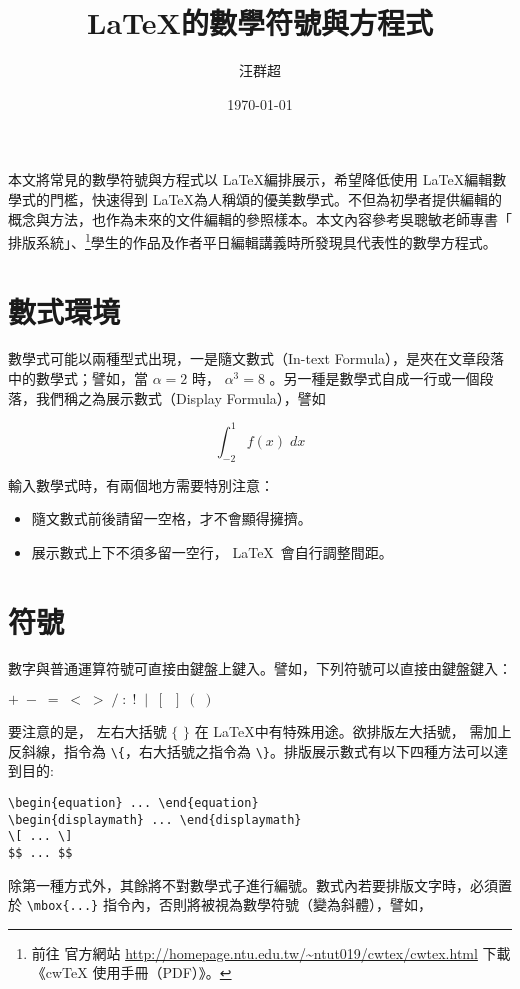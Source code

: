 \documentclass[12pt, a4paper]{article}
\title{ \LaTeX 的數學符號與方程式}
\author{{\SM 汪群超}}
\date{{\TT \today}}
\begin{document}
\maketitle
\fontsize{12}{22 pt}\selectfont

本文將常見的數學符號與方程式以 \LaTeX 編排展示，希望降低使用  \LaTeX 編輯數學式的門檻，快速得到  \LaTeX 為人稱頌的優美數學式。不但為初學者提供編輯的概念與方法，也作為未來的文件編輯的參照樣本。本文內容參考吳聰敏老師專書「\cw{} 排版系統」、\footnote{前往 \cw{} 官方網站 \url{http://homepage.ntu.edu.tw/~ntut019/cwtex/cwtex.html} 下載《cwTeX 使用手冊（PDF）》。}學生的作品及作者平日編輯講義時所發現具代表性的數學方程式。

\section{數式環境}
數學式可能以兩種型式出現，一是隨文數式（In-text Formula），是夾在文章段落中的數學式；譬如，當 $\alpha=2$ 時， $\alpha^3=8$ 。另一種是數學式自成一行或一個段落，我們稱之為展示數式（Display Formula），譬如

$$\int_{-2}^{1} f(x)\;dx$$

輸入數學式時，有兩個地方需要特別注意：

\begin{itemize}
\item 隨文數式前後請留一空格，才不會顯得擁擠。
\item 展示數式上下不須多留一空行， \LaTeX\ 會自行調整間距。
\end{itemize}

\section{符號}
數字與普通運算符號可直接由鍵盤上鍵入。譬如，下列符號可以直接由鍵盤鍵入：

        \begin{center}
         $  + \;-\; =\; <\; > \;/ \;:\; !\;\; |\; \;[\;\; ] \;(\; )$\\
        \end{center}
要注意的是， 左右大括號  $\{$ $\}$ 在 \LaTeX 中有特殊用途。欲排版左大括號， 需加上反斜線，指令為 \verb+\{+，右大括號之指令為 \verb+\}+。排版展示數式有以下四種方法可以達到目的:
        \begin{center}
        \verb+\begin{equation} ... \end{equation}+\\
		\verb+\begin{displaymath} ... \end{displaymath}+\\
		\verb+\[ ... \]+\\
		\verb+$$ ... $$+
        \end{center}
除第一種方式外，其餘將不對數學式子進行編號。數式內若要排版文字時，必須置於 \verb+\mbox{...}+ 指令內，否則將被視為數學符號（變為斜體），譬如，
\end{document}
